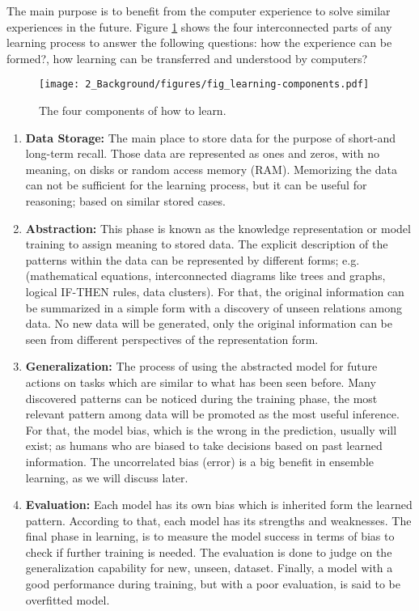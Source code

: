 The main purpose is to benefit from the computer experience to solve similar experiences in the future. Figure \ref{ch2:learning-process} shows the four interconnected parts of any learning process to answer the following questions: how the experience can be formed?, how learning can be transferred and understood by computers?     
 
 \begin{figure}[!ht]
    \centering
    \texttt{[image: 2\_Background/figures/fig\_learning-components.pdf]}
    \caption{The four components of how to learn.}
    \label{ch2:learning-process}
\end{figure}
 
 \begin{enumerate}
     \item \textbf{Data Storage:} The main place to store data for the purpose of short-and long-term recall. Those data are represented as ones and zeros, with no meaning, on disks or random access memory (RAM). Memorizing the data can not be sufficient for the learning process, but it can be useful for reasoning; based on similar stored cases.  
     \item \textbf{Abstraction:} This phase is known as the knowledge representation or model training to assign meaning to stored data. The explicit description of the patterns within the data can be represented by different forms; e.g.(mathematical equations, interconnected diagrams like trees and graphs, logical IF-THEN rules, data clusters). For that, the original information can be summarized in a simple form with a discovery of unseen relations among data. No new data will be generated, only the original information can be seen from different perspectives of the representation form. 
     \item \textbf{Generalization:} The process of using the abstracted model for future actions on tasks which are similar to what has been seen before. Many discovered patterns can be noticed during the training phase, the most relevant pattern among data will be promoted as the most useful inference. For that, the model bias, which is the wrong in the prediction, usually will exist; as humans who are biased to take decisions based on past learned information. The uncorrelated bias (error) is a big benefit in ensemble learning, as we will discuss later.  
     \item \textbf{Evaluation:} Each model has its own bias which is inherited form the learned pattern. According to that, each model has its strengths and weaknesses. The final phase in learning, is to measure the model success in terms of bias to check if further training is needed. The evaluation is done to judge on the generalization capability for new, unseen, dataset. Finally, a model with a good performance during training, but with a poor evaluation, is said to be overfitted model. 
 \end{enumerate}
 
